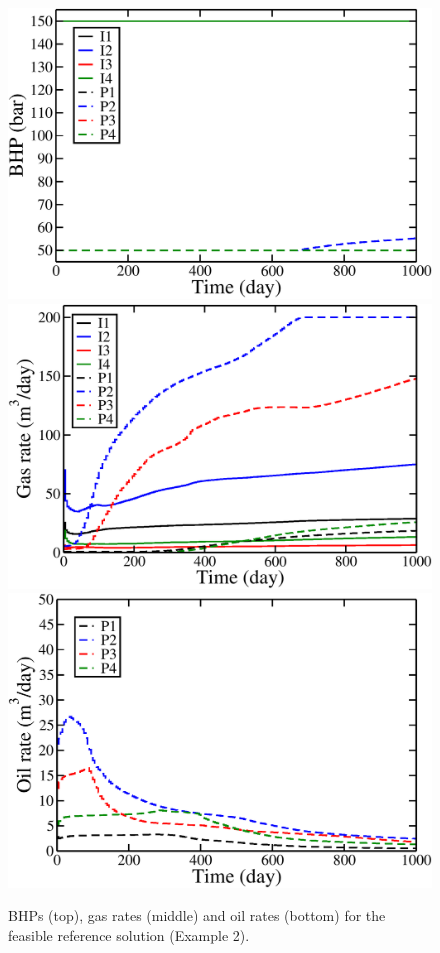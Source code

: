 \begin{figure}
\begin{center}
\includegraphics[totalheight=2.2in,angle=0]{figures/spe10topLayerReferenceC200_BHP.pdf}
\includegraphics[totalheight=2.17in,angle=0]{figures/spe10topLayerReferenceC200_rate_gas.pdf}
\includegraphics[totalheight=2.2in,angle=0]{figures/spe10topLayerReferenceC200_rate_oil.pdf}
\end{center}
\caption{BHPs (top), gas rates (middle) and oil rates
  (bottom) for the feasible reference solution (Example 2).}
\label{fig:SPE10TopLayerReferenceRates}
\end{figure}

